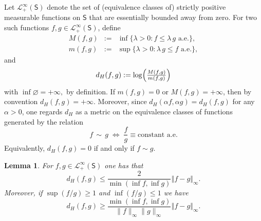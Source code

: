 \documentclass[a4paper,11pt]{amsart}
\theoremstyle{plain}
\newtheorem{lemma}[theorem]{Lemma}
\theoremstyle{remark}
\begin{document}
Let $\mathcal{L}_{+}^{\infty}(\mathsf{S})$ denote the set of (equivalence classes of) strictly positive measurable functions on $\mathsf{S}$ that are essentially bounded away from zero.  
For two such functions $f,g \in \mathcal{L}_{+}^{\infty}(\mathsf{S})$, define
\begin{eqnarray*}
  M(f,g) 
  &:= &\inf\{\lambda>0 : f \le \lambda\,g\text{ a.e.}\}, 
  \\
  m(f,g) 
  &:=& \sup\{\lambda>0 : \lambda\,g \le f\text{ a.e.}\},
\end{eqnarray*}
and
\begin{eqnarray*}
d_{H}(f,g) 
  := \log \Bigl(\tfrac{M(f,g)}{m(f,g)}\Bigr)
\end{eqnarray*}
with  \(\inf \varnothing = +\infty,\) by definition.
If $m(f,g) = 0$ or $M(f,g) = +\infty$, then by convention $d_H(f,g) = +\infty$.  
Moreover, since $d_{H}(\alpha f,\alpha g)=d_{H}(f,g)$ for any $\alpha>0$, 
one regards $d_{H}$ as a metric on the equivalence classes of functions 
generated by the relation
\[
  f \,\sim\, g 
  \;\Longleftrightarrow\; 
  \frac{f}{g} \equiv \text{constant a.e.}
\]
Equivalently, $d_{H}(f,g) = 0$ if and only if $f \sim g$.

\begin{lemma}
\label{lemH} For $f,g\in\mathcal{L}_{+}^{\infty}(\mathsf{S})$  one has that%
\[
 d_{H}(f,g)\leq\frac{2}{\min(\inf f,\inf g)}\left\Vert f-g\right\Vert _{\infty}.
\]
Moreover, if $\sup(f/g)\geq 1$  and $\inf(f/g)\leq 1$ we have
\[
d_{H}(f,g)\geq \frac{\min(\inf f,\inf g)}{\|f\|_{\infty}\|g\|_{\infty}}\left\Vert f-g\right\Vert _{\infty}. 
\]
\end{lemma}
\end{document}
